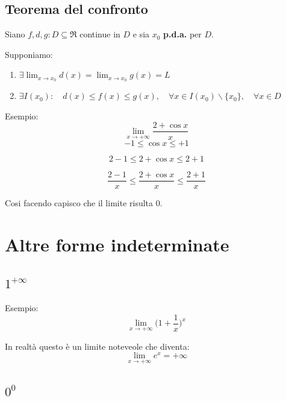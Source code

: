 \documentclass{article}
\begin{document}
\subsection{Teorema del confronto}
Siano $f, d, g : D \subseteq \Re$ continue in $D$ e sia $x_0$ \textbf{p.d.a.} per $D$.

Supponiamo:
\begin{enumerate}
    \item $\exists \lim_{x \rightarrow x_0} d(x) = \lim_{x \rightarrow x_0} g(x) = L$
    \item $\exists I(x_0) : \quad d(x) \leq f(x) \leq g(x), \quad \forall x \in I(x_0) \backslash \{x_0\},\quad \forall x \in D$
\end{enumerate}

Esempio:
\begin{equation*}
    \lim_{x \rightarrow + \infty} \frac{2+\cos x}{x}
\end{equation*}
\begin{equation*}
    -1 \leq \cos x \leq +1
\end{equation*}

\begin{equation*}
    2-1 \leq 2 + \cos x \leq 2+1
\end{equation*}

\begin{equation*}
    \frac{2-1}{x} \leq \frac{2 + \cos x}{x} \leq \frac{2+1}{x}
\end{equation*}

Cosi facendo capisco che il limite risulta 0.

\section{Altre forme indeterminate}
\subsection{$1^{+\infty}$}

Esempio:
\begin{equation*}
    \lim_{x \rightarrow + \infty} \Big(1 + \frac{1}{x}\Big)^x
\end{equation*}

In realtà questo è un limite noteveole che diventa:
\begin{equation*}
    \lim_{x \rightarrow + \infty} e^x = +\infty
\end{equation*}

\subsection{$0^{0}$}
\end{document}

